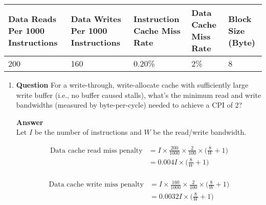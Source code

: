 \documentclass[10pt]{extarticle}
\begin{document}
\begin{enumerate}
            \begin{table}[h]
                \centering
                \begin{tabular}{p{2cm}p{2cm}p{2cm}p{2cm}p{1.5cm}}
                    \textbf{Data Reads Per 1000 Instructions} & \textbf{Data
                    Writes Per 1000 Instructions} & \textbf{Instruction Cache
                    Miss Rate} & \textbf{Data Cache Miss Rate} & \textbf{Block
                    Size (Byte)} \\
                    \hline
                    200 & 160 & 0.20\% & 2\% & 8 \\
                \end{tabular}
            \end{table}

        \begin{enumerate}

            \item \textbf{Question} For a write-through, write-allocate cache
            with sufficiently large write buffer (i.e., no buffer caused
            stalls), what’s the minimum read and write bandwidths (measured by
            byte-per-cycle) needed to achieve a CPI of 2?

            \textbf{Answer} \\ Let $I$ be the number of instructions and $W$ be
            the read/write bandwidth.

            \begin{equation*}
                \begin{split}
                    \text{Data cache read miss penalty} &
                    = I \times \frac{200}{1000} \times \frac{2}{100} \times
                    \bigg(\frac{8}{W} + 1\bigg) \\
                    & = 0.004I \times \bigg(\frac{8}{W} + 1\bigg) \\
                \end{split}
            \end{equation*}

            \begin{equation*}
                \begin{split}
                    \text{Data cache write miss penalty} &
                    = I \times \frac{160}{1000} \times \frac{2}{100} \times
                    \bigg(\frac{8}{W} + 1\bigg) \\
                    & = 0.0032I \times \bigg(\frac{8}{W} + 1\bigg) \\
                \end{split}
            \end{equation*}


\end{enumerate}
\end{enumerate}
\end{document}
